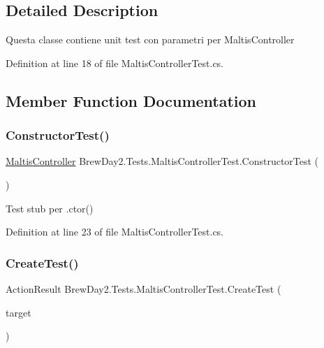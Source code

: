 \subsection{Detailed Description}
Questa classe contiene unit test con parametri per Maltis\+Controller



Definition at line 18 of file Maltis\+Controller\+Test.\+cs.



\subsection{Member Function Documentation}
\mbox{\label{class_brew_day2_1_1_tests_1_1_maltis_controller_test_a4172f3e4782ba5e0b63fdf77bdfd99bd}} 
\subsubsection{\texorpdfstring{Constructor\+Test()}{ConstructorTest()}}
{\footnotesize\ttfamily \mbox{\hyperlink{class_brew_day2_1_1_controllers_1_1_maltis_controller}{Maltis\+Controller}} Brew\+Day2.\+Tests.\+Maltis\+Controller\+Test.\+Constructor\+Test (\begin{DoxyParamCaption}{ }\end{DoxyParamCaption})}



Test stub per .ctor()



Definition at line 23 of file Maltis\+Controller\+Test.\+cs.

\mbox{\label{class_brew_day2_1_1_tests_1_1_maltis_controller_test_ab3df133fcf96ea27ef290885ac2be0d1}} 
\subsubsection{\texorpdfstring{Create\+Test()}{CreateTest()}}
{\footnotesize\ttfamily Action\+Result Brew\+Day2.\+Tests.\+Maltis\+Controller\+Test.\+Create\+Test (\begin{DoxyParamCaption}\item[{\mbox{[}\+Pex\+Assume\+Under\+Test\mbox{]} \mbox{\hyperlink{class_brew_day2_1_1_controllers_1_1_maltis_controller}{Maltis\+Controller}}}]{target }\end{DoxyParamCaption})}



